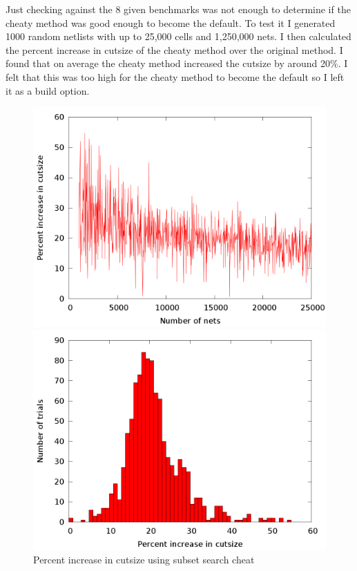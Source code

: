 \documentclass[10pt]{article}
\begin{document}
Just checking against the 8 given benchmarks was not enough to determine if the
cheaty method was good enough to become the default. To test it I generated
1000 random netlists with up to 25,000 cells and 1,250,000 nets. I then
calculated the percent increase in cutsize of the cheaty method over the original
method. I found that on average the cheaty method increased the cutsize by
around 20\%. I felt that this was too high for the cheaty method to become the
default so I left it as a build option.
\begin{figure}[H]
    \centering
    \begin{minipage}{.5\textwidth}
        \centering
        \includegraphics[width=0.8\linewidth]{../tests/cheat_vs_original.png}
    \end{minipage}%
    \begin{minipage}{.5\textwidth}
        \centering
        \includegraphics[width=0.8\linewidth]{../tests/cheat_vs_original_hist.png}
    \end{minipage}
    \caption{Percent increase in cutsize using subset search cheat}
\end{figure}
\end{document}
